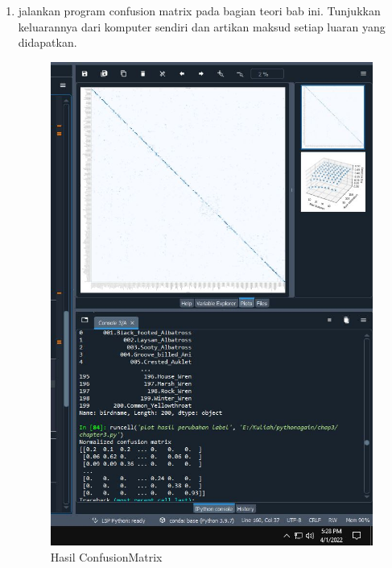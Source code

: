 \begin{enumerate}
\newpage
\item jalankan program confusion matrix pada bagian teori bab ini. Tunjukkan keluarannya dari komputer sendiri dan artikan maksud setiap luaran yang didapatkan.
\begin{figure}[!htbp]
    \centering
    \includegraphics[scale=0.5]{figures/chap3ConfusionMatrix.JPG}
	\caption{Hasil  ConfusionMatrix}
\end{figure}


\end{enumerate}
